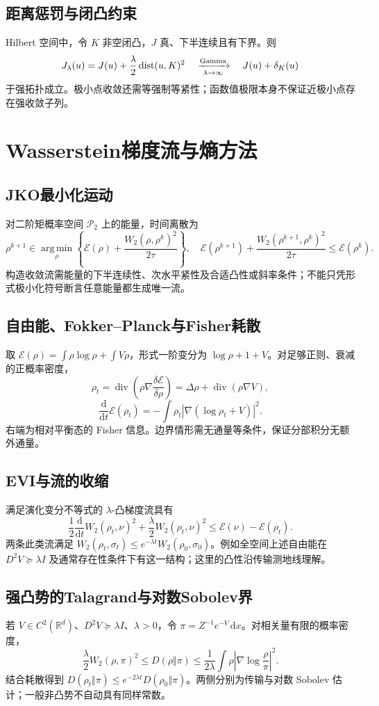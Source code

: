 \documentclass[../main.tex]{subfiles}
\begin{document}
\subsection{距离惩罚与闭凸约束}
Hilbert 空间中，令 $K$ 非空闭凸，$J$ 真、下半连续且有下界。则
\[
J_\lambda(u)=J(u)+\frac\lambda2\operatorname{dist}(u,K)^2
\quad\xrightarrow[\lambda\to\infty]{\rm Gamma}\quad J(u)+\delta_K(u)
\]
于强拓扑成立。极小点收敛还需等强制等紧性；函数值极限本身不保证近极小点存在强收敛子列。
\section{Wasserstein梯度流与熵方法}
\subsection{JKO最小化运动}
对二阶矩概率空间 $\mathcal P_2$ 上的能量，时间离散为
\[
\rho^{k+1}\in\operatorname*{arg\,min}_\rho
\left\{\mathcal E(\rho)+\frac{W_2(\rho,\rho^k)^2}{2\tau}\right\},
\quad
\mathcal E(\rho^{k+1})+\frac{W_2(\rho^{k+1},\rho^k)^2}{2\tau}\le\mathcal E(\rho^k).
\]
构造收敛流需能量的下半连续性、次水平紧性及合适凸性或斜率条件；不能只凭形式极小化符号断言任意能量都生成唯一流。
\subsection{自由能、Fokker--Planck与Fisher耗散}
取 $\mathcal E(\rho)=\int\rho\log\rho+\int V\rho$，形式一阶变分为 $\log\rho+1+V$。对足够正则、衰减的正概率密度，
\[
\rho_t=\operatorname{div}\left(\rho\nabla\frac{\delta\mathcal E}{\delta\rho}\right)
=\Delta\rho+\operatorname{div}(\rho\nabla V),
\]
\[
\frac{\mathrm d}{\mathrm dt}\mathcal E(\rho_t)
=-\int\rho_t|\nabla(\log\rho_t+V)|^2.
\]
右端为相对平衡态的 Fisher 信息。边界情形需无通量等条件，保证分部积分无额外通量。
\subsection{EVI与流的收缩}
满足演化变分不等式的 $\lambda$-凸梯度流具有
\[
\frac12\frac{\mathrm d}{\mathrm dt}W_2(\rho_t,\nu)^2
+\frac\lambda2W_2(\rho_t,\nu)^2\le\mathcal E(\nu)-\mathcal E(\rho_t).
\]
两条此类流满足 $W_2(\rho_t,\sigma_t)\le e^{-\lambda t}W_2(\rho_0,\sigma_0)$。例如全空间上述自由能在 $D^2V\succeq\lambda I$ 及通常存在性条件下有这一结构；这里的凸性沿传输测地线理解。
\subsection{强凸势的Talagrand与对数Sobolev界}
若 $V\in C^2(\mathbb R^d)$、$D^2V\succeq\lambda I$、$\lambda>0$，令 $\pi=Z^{-1}e^{-V}\,\mathrm dx$。对相关量有限的概率密度，
\[
\frac\lambda2W_2(\rho,\pi)^2\le D(\rho\Vert\pi)
\le\frac1{2\lambda}\int\rho\left|\nabla\log\frac\rho\pi\right|^2.
\]
结合耗散得到 $D(\rho_t\Vert\pi)\le e^{-2\lambda t}D(\rho_0\Vert\pi)$。两侧分别为传输与对数 Sobolev 估计；一般非凸势不自动具有同样常数。
\end{document}
